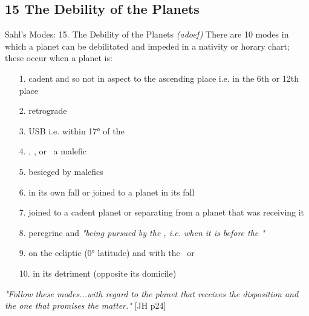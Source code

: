 \subsection{15 The Debility of the Planets}
\begin{frame}[t]{Sahl's Modes: 15. The Debility of the Planets}
\small
\vspace{-0.2cm}
\textsl{(adoef)} There are 10 modes in which a planet can be debilitated and impeded in a nativity or horary chart; these occur when a planet is:
\vspace{-0.25cm}
\begin{enumerate}
\item[1.] cadent and so not in aspect to the ascending place i.e. in the 6th or 12th place
\item[2.] retrograde
\item[3.] USB i.e. within 17° of the \Sun
\item[4.] \Conjunction, \Square, or \Opposition\ a malefic
\item[5.] besieged by malefics
\item[6.] in its own fall or joined to a planet in its fall
\item[7.] joined to a cadent planet or separating from a planet that was receiving it
\item[8.] peregrine and \textsl{"being pursued by the \Sun, i.e. when it is before the \Sun"}\footnotemark[1]
\item[9.] on the ecliptic (0° latitude) and with the \NorthNode\ or \SouthNode
\item[10.] in its detriment (opposite its domicile) 
\end{enumerate}
\vspace{-0.2cm}
\footnotesize
\textsl{"Follow these modes...with regard to the planet that receives the disposition and the one that promises the matter."} [JH p24]


\end{frame}
